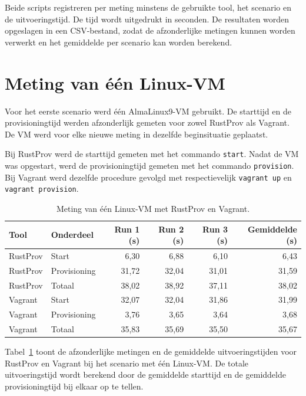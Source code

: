 Beide scripts registreren per meting minstens de gebruikte tool, het scenario en
de uitvoeringstijd. De tijd wordt uitgedrukt in seconden. De resultaten worden
opgeslagen in een CSV-bestand, zodat de afzonderlijke metingen kunnen worden
verwerkt en het gemiddelde per scenario kan worden berekend.

\section{Meting van één Linux-VM}

Voor het eerste scenario werd één AlmaLinux9-VM gebruikt. De starttijd en de
provisioningtijd werden afzonderlijk gemeten voor zowel RustProv als Vagrant. De
VM werd voor elke nieuwe meting in dezelfde beginsituatie geplaatst.

Bij RustProv werd de starttijd gemeten met het commando \texttt{start}. Nadat de
VM was opgestart, werd de provisioningtijd gemeten met het commando
\texttt{provision}. Bij Vagrant werd dezelfde procedure gevolgd met
respectievelijk \texttt{vagrant up} en \texttt{vagrant provision}.

\begin{table}[htbp]
    \centering
    \caption{Meting van één Linux-VM met RustProv en Vagrant.}
    \label{tab:meting-een-linux}
    \begin{tabular}{llrrrr}
        \toprule
        \textbf{Tool} &
        \textbf{Onderdeel} &
        \textbf{Run 1 (s)} &
        \textbf{Run 2 (s)} &
        \textbf{Run 3 (s)} &
        \textbf{Gemiddelde (s)} \\
        \midrule
        RustProv & Start & 6,30 & 6,88 & 6,10 & 6,43 \\
        RustProv & Provisioning & 31,72 & 32,04 & 31,01 & 31,59 \\
        RustProv & Totaal & 38,02 & 38,92 & 37,11 & 38,02 \\
        Vagrant  & Start & 32,07 & 32,04 & 31,86 & 31,99 \\
        Vagrant  & Provisioning & 3,76 & 3,65 & 3,64 & 3,68 \\
        Vagrant  & Totaal & 35,83 & 35,69 & 35,50 & 35,67 \\
        \bottomrule
    \end{tabular}
\end{table}

Tabel~\ref{tab:meting-een-linux} toont de afzonderlijke metingen en de
gemiddelde uitvoeringstijden voor RustProv en Vagrant bij het scenario met één
Linux-VM. De totale uitvoeringstijd wordt berekend door de gemiddelde starttijd
en de gemiddelde provisioningtijd bij elkaar op te tellen.

